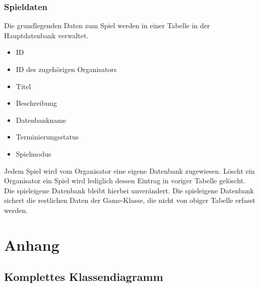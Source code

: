 \documentclass[a4paper]{scrreprt}
\begin{document}
	\subsection{Spieldaten}
	Die grundlegenden Daten zum Spiel werden in einer Tabelle in der Hauptdatenbank verwaltet.
	\begin{itemize}
		\item ID
        \item ID des zugehörigen Organisators
		\item Titel
		\item Beschreibung
		\item Datenbankname
		\item Terminierungsstatus
		\item Spielmodus
	\end{itemize}
	Jedem Spiel wird vom Organisator eine eigene Datenbank zugewiesen.
	Löscht ein Organisator ein Spiel wird lediglich dessen Eintrag in voriger Tabelle gelöscht.
	Die spieleigene Datenbank bleibt hierbei unverändert.
	Die spieleigene Datenbank sichert die restlichen Daten der Game-Klasse, die nicht von obiger Tabelle erfasst werden.


	\chapter{Anhang}
	\section{Komplettes Klassendiagramm}
\end{document}
